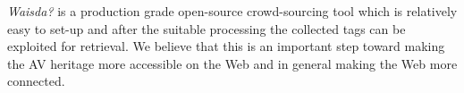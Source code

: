 \textit{Waisda?} is a production grade open-source crowd-sourcing tool which is relatively easy to set-up and after the suitable processing the collected tags can be exploited for retrieval. We believe that this is an important step toward making the AV heritage more accessible on the Web and in general making the Web more connected.